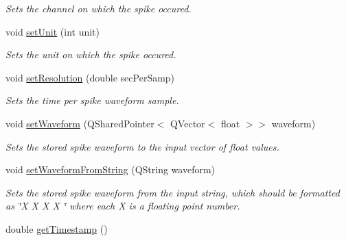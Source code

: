 \begin{DoxyCompactItemize}
\begin{DoxyCompactList}\small\item\em Sets the channel on which the spike occured. \end{DoxyCompactList}\item 
\hypertarget{class_picto_1_1_neural_data_unit_a7aed10c7ec7f6c28d49efd24bc243393}{void \hyperlink{class_picto_1_1_neural_data_unit_a7aed10c7ec7f6c28d49efd24bc243393}{set\-Unit} (int unit)}\label{class_picto_1_1_neural_data_unit_a7aed10c7ec7f6c28d49efd24bc243393}

\begin{DoxyCompactList}\small\item\em Sets the unit on which the spike occured. \end{DoxyCompactList}\item 
\hypertarget{class_picto_1_1_neural_data_unit_a5dcf75ab72ce04e9f3e3ea86c6a6bd8a}{void \hyperlink{class_picto_1_1_neural_data_unit_a5dcf75ab72ce04e9f3e3ea86c6a6bd8a}{set\-Resolution} (double sec\-Per\-Samp)}\label{class_picto_1_1_neural_data_unit_a5dcf75ab72ce04e9f3e3ea86c6a6bd8a}

\begin{DoxyCompactList}\small\item\em Sets the time per spike waveform sample. \end{DoxyCompactList}\item 
\hypertarget{class_picto_1_1_neural_data_unit_a50f86f683e539ed7c6513c58c620f2fd}{void \hyperlink{class_picto_1_1_neural_data_unit_a50f86f683e539ed7c6513c58c620f2fd}{set\-Waveform} (Q\-Shared\-Pointer$<$ Q\-Vector$<$ float $>$$>$ waveform)}\label{class_picto_1_1_neural_data_unit_a50f86f683e539ed7c6513c58c620f2fd}

\begin{DoxyCompactList}\small\item\em Sets the stored spike waveform to the input vector of float values. \end{DoxyCompactList}\item 
\hypertarget{class_picto_1_1_neural_data_unit_abf2bea9a3ec957974d5d73d7ae77006c}{void \hyperlink{class_picto_1_1_neural_data_unit_abf2bea9a3ec957974d5d73d7ae77006c}{set\-Waveform\-From\-String} (Q\-String waveform)}\label{class_picto_1_1_neural_data_unit_abf2bea9a3ec957974d5d73d7ae77006c}

\begin{DoxyCompactList}\small\item\em Sets the stored spike waveform from the input string, which should be formatted as \char`\"{}\-X X X X \char`\"{} where each X is a floating point number. \end{DoxyCompactList}\item 
\hypertarget{class_picto_1_1_neural_data_unit_aee21f003133a3af967a56a4b960d645f}{double \hyperlink{class_picto_1_1_neural_data_unit_aee21f003133a3af967a56a4b960d645f}{get\-Timestamp} ()}\label{class_picto_1_1_neural_data_unit_aee21f003133a3af967a56a4b960d645f}


\end{DoxyCompactItemize}
